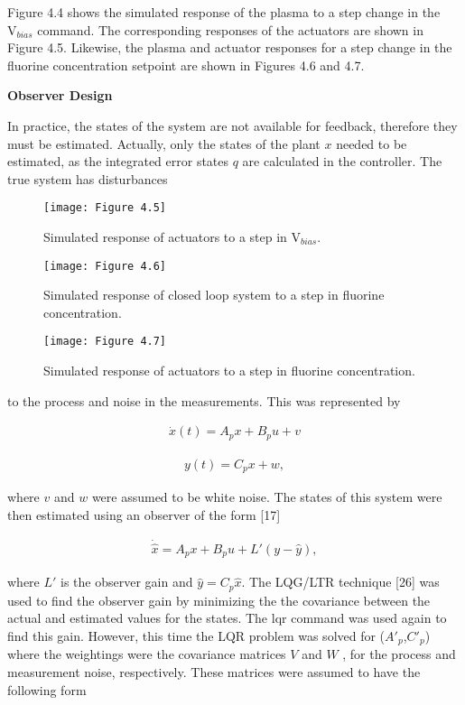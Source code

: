 \noindent Figure 4.4 shows the simulated response of the plasma to a step change in the $\text{V}_{bias}$ command. The corresponding responses of the actuators are shown in Figure 4.5. Likewise, the plasma and actuator responses for a step change in the fluorine concentration setpoint are shown in Figures 4.6 and 4.7.

\noindent\textbf{Observer Design}

In practice, the states of the system are not available for feedback, therefore they must be estimated. Actually, only the states of the plant $x$ needed to be estimated, as the integrated error states $q$ are calculated in the controller. The true system has disturbances

\begin{figure}[H]
	\centering
	\texttt{[image: Figure 4.5]}
	\bf\caption{ Simulated response of actuators to a step in $\text{V}_{bias}$.}
	\label{fig:4.5}
\end{figure}

\begin{figure}[H]
	\centering
	\texttt{[image: Figure 4.6]}
	\bf\caption{ Simulated response of closed loop system to a step in fluorine concentration.
	}
	\label{fig:4.6}
\end{figure}

\begin{figure}[H]
	\centering
	\texttt{[image: Figure 4.7]}
	\bf\caption{ Simulated response of actuators to a step in fluorine concentration.}
	\label{fig:4.7}
\end{figure}

to the process and noise in the measurements. This was represented by

\begin{align*}
	\dot x(t) = A_{p}x+B_{p}u+v
\end{align*}

\begin{align}
	y(t) = C_{p}x+w,
\end{align}

where $v$ and $w$ were assumed to be white noise. The states of this system were then estimated using an observer of the form [17]


\begin{align}
	\dot{\hat{x}} = A_{p}x + B_{p}u + L'(y-\hat{y}),
\end{align}

\noindent where $L'$ is the observer gain and $\hat{y} = C_{p}\hat{x}$. The LQG/LTR technique [26] was used to find the observer gain by minimizing the the covariance between the actual and estimated values for the states. The lqr command was used again to find this gain. However, this time the LQR problem was solved for ($A'_{p}$,$C'_{p}$) where the weightings were the covariance matrices $V$ and $W$ , for the process and measurement noise, respectively. These matrices were assumed to have the following form


